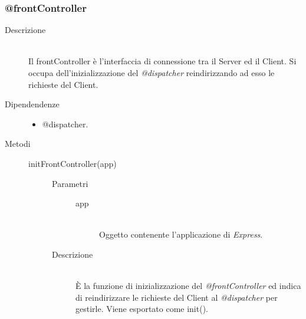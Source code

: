 \subsubsection{@frontController}
\begin{description}
 \item[Descrizione] \hfill \\
 Il frontController è l'interfaccia di connessione tra il Server ed il Client. Si occupa dell'inizializzazione del \textit{@dispatcher} reindirizzando ad esso le richieste del Client.
 \item[Dipendendenze] \hfill
 \begin{itemize}
 \item @dispatcher.
 \end{itemize}
 \item[Metodi] \hfill
  \begin{description}
    \item[initFrontController(app)] \hfill 
    \begin{description}
       		\item[Parametri] \hfill
       			\begin{description}
       				\item[app] \hfill \\
       				Oggetto contenente l'applicazione di \textit{Express}.
       			\end{description}
       		\item[Descrizione] \hfill \\
       		\`{E} la funzione di inizializzazione del \textit{@frontController} ed indica di reindirizzare le richieste del Client al \textit{@dispatcher} per gestirle. Viene esportato come init().
   \end{description}
  \end{description}
\end{description}

